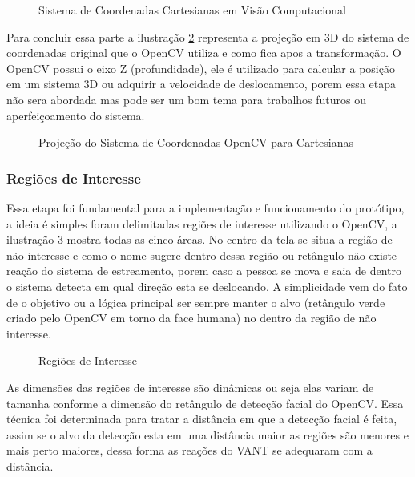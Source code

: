 \begin{figure}[H]
	\centering
	\caption{Sistema de Coordenadas Cartesianas em Visão Computacional}
	
	\label{fig:teste}
\end{figure}

Para concluir essa parte a ilustração \ref{fig:conv} representa a projeção em 3D do sistema de coordenadas original que o OpenCV utiliza e como fica apos a transformação. O OpenCV possui o eixo Z (profundidade), ele é utilizado para calcular a posição em um sistema 3D ou adquirir a velocidade de deslocamento, porem essa etapa não sera abordada mas pode ser um bom tema para trabalhos futuros ou aperfeiçoamento do sistema.

\begin{figure}[H]
	\centering
	\caption{Projeção do Sistema de Coordenadas OpenCV para Cartesianas}
	
	\label{fig:conv}
\end{figure}

\subsubsection{Regiões de Interesse}

Essa etapa foi fundamental para a implementação e funcionamento do protótipo, a ideia é simples foram delimitadas regiões de interesse utilizando o OpenCV, a ilustração \ref{fig:regint} mostra todas as cinco áreas. No centro da tela se situa a região de não interesse e como o nome sugere dentro dessa região ou retângulo não existe reação do sistema de estreamento, porem caso a pessoa se mova e saia de dentro o sistema detecta em qual direção esta se deslocando. A simplicidade vem do fato de o objetivo ou a lógica principal ser sempre manter o alvo (retângulo verde criado pelo OpenCV em torno da face humana) no dentro da região de não interesse.  

\begin{figure}[H]
	\centering
	\caption{Regiões de Interesse}
	
	\label{fig:regint}
\end{figure}
As dimensões das regiões de interesse são dinâmicas ou seja elas variam de tamanha conforme a dimensão do retângulo de detecção facial do OpenCV. Essa técnica foi determinada para tratar a distância em que a detecção facial é feita, assim se o alvo da detecção esta em uma distância maior as regiões são menores e mais perto maiores, dessa forma as reações do VANT se adequaram com a distância.

